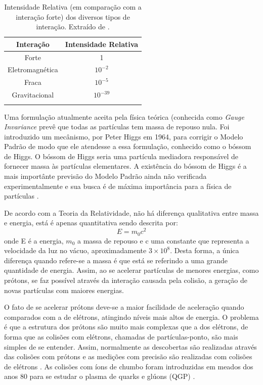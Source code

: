 \begin{table}
\centering
\begin{tabular}{cc}
\hline
\textbf{Interação} & \textbf{Intensidade Relativa} \\
\hline
Forte & 1 \\
Eletromagnética & $10^{-2}$ \\
Fraca & $10^{-5}$ \\
Gravitacional & $10^{-39}$ \\
\hline
\label{tab:interacoes}
\end{tabular}
\caption{Intensidade Relativa (em comparação com a interação forte) dos diversos
tipos de interação. Extraído de \cite{tese_eduardo}.}
\end{table}

Uma formulação atualmente aceita pela física teórica (conhecida como \emph{Gauge
Invariance} prevê que todas as partículas tem massa de repouso nula. Foi
introduzido um mecânismo, por Peter Higgs em 1964, para corrigir o Modelo Padrão de modo que ele atendesse
a essa formulação, conhecido como o bóssom de Higgs. O bóssom de Higgs seria
uma partícula mediadora responsável de fornecer massa às partículas elementares.
A existência do bóssom de Higgs é a mais importânte previsão do Modelo Padrão
ainda não verificada experimentalmente e sua busca é de máxima importância para
a física de partículas \cite{tese_eduardo}.

De acordo com a Teoria da Relatividade, não há diferença qualitativa entre
massa e energia, está é apenas quantitativa \cite{einstein} sendo descrita por:
\begin{equation}
E=m_0c^2
\end{equation}
onde E é a energia, $m_0$ a massa de repouso e c uma constante que representa a
velocidade da luz no vácuo, aproximadamente $3\times 10^{8}$. Desta forma, a
única diferença quando refere-se a massa é que está se referindo a uma grande
quantidade de energia. Assim, ao se acelerar partículas de menores energias,
como prótons, se faz possível através da interação causada pela colisão, 
a geração de novas partículas com maiores energias.

O fato de se acelerar prótons deve-se a maior facilidade de aceleração quando
comparados com a de elétrons, atingindo níveis mais altos de energia. O problema é que a
estrutura dos prótons são muito mais complexas que a dos elétrons, de forma que
as colisões com elétrons, chamadas de partículas-ponto, são mais simples de se entender. Assim, normalmente as
descobertas são realizadas através das colisões com prótons e as medições com
precisão são realizadas com colisões de elétrons \cite{nature_space_and_time}.
As colisões com íons de chumbo foram introduzidas em meados dos anos 80
para se estudar o plasma de quarks e glúons (QGP) \cite{heavy_ions}.


